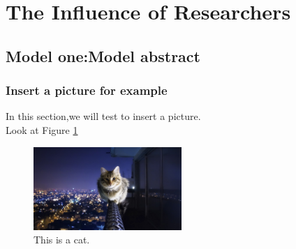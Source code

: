 \documentclass[a4paper,11pt]{article}
\begin{document}
\section{The Influence of Researchers}%
\subsection{Model one:Model abstract}%
\subsubsection{Insert a picture for example}
In this section,we will test to insert a picture.\\

Look at Figure \ref{fig:1}

\begin{figure}[!h]%
\centering %
\includegraphics[width=0.50\textwidth]{./Pic/cat.JPG}
\caption{This is a cat.}
\label{fig:1}       %
\end{figure}
\end{document}
